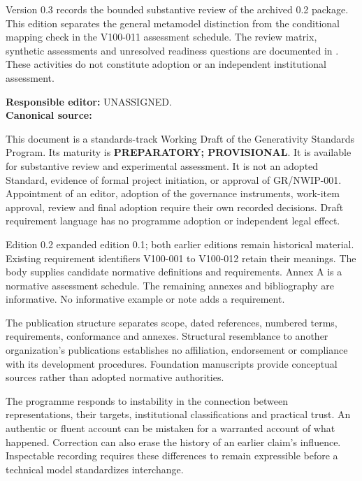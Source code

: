 \documentclass[11pt,a4paper]{article}
\begin{document}
\GSPfrontmatter
{}
Version 0.3 records the bounded substantive review of the archived 0.2 package. This edition separates the general metamodel distinction from the conditional mapping check in the V100-011 assessment schedule. The review matrix, synthetic assessments and unresolved readiness questions are documented in . These activities do not constitute adoption or an independent institutional assessment.

\noindent\textbf{Responsible editor:} UNASSIGNED.\\
\textbf{Canonical source:} 

This document is a standards-track Working Draft of the Generativity Standards Program. Its maturity is \textbf{PREPARATORY; PROVISIONAL}. It is available for substantive review and experimental assessment. It is not an adopted Standard, evidence of formal project initiation, or approval of GR/NWIP-001. Appointment of an editor, adoption of the governance instruments, work-item approval, review and final adoption require their own recorded decisions. Draft requirement language has no programme adoption or independent legal effect.

Edition 0.2 expanded edition 0.1; both earlier editions remain historical material. Existing requirement identifiers V100-001 to V100-012 retain their meanings. The body supplies candidate normative definitions and requirements. Annex A is a normative assessment schedule. The remaining annexes and bibliography are informative. No informative example or note adds a requirement.

The publication structure separates scope, dated references, numbered terms, requirements, conformance and annexes. Structural resemblance to another organization's publications establishes no affiliation, endorsement or compliance with its development procedures. Foundation manuscripts provide conceptual sources rather than adopted normative authorities.

\tableofcontents\clearpage
{}
The programme responds to instability in the connection between representations, their targets, institutional classifications and practical trust. An authentic or fluent account can be mistaken for a warranted account of what happened. Correction can also erase the history of an earlier claim's influence. Inspectable recording requires these differences to remain expressible before a technical model standardizes interchange.
\end{document}
